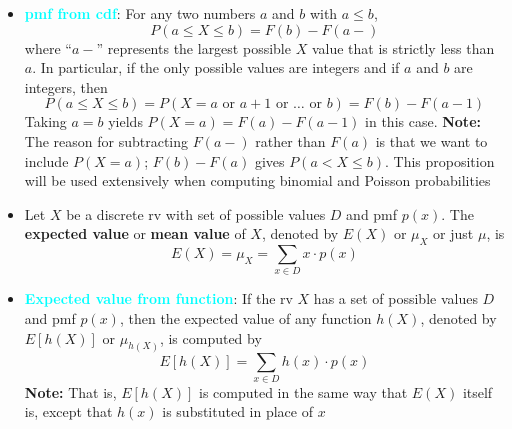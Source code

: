 \documentclass{report}
\begin{document}
\begin{itemize}
    \item \textbf{\textcolor{cyan}{pmf from cdf}}:
        For any two numbers \(a\) and \(b\) with \(a \leq b\),
        \[
            P(a \leq X \leq b) = F(b) - F(a-)
        \]
        where “\(a-\)” represents the largest possible \(X\) value that is strictly less than \(a\). In particular, if the only possible values are integers and if \(a\) and \(b\) are integers, then
        \[
            P(a \leq X \leq b) = P(X = a \text{ or } a + 1 \text{ or } \ldots \text{ or } b) = F(b) - F(a-1)
        \]
        Taking \(a = b\) yields \(P(X = a) = F(a) - F(a-1)\) in this case.
        \bigbreak \noindent 
        \textbf{Note:} The reason for subtracting \(F(a-)\) rather than \(F(a)\) is that we want to include \(P(X = a)\); \(F(b) - F(a)\) gives \(P(a < X \leq b)\). This proposition will be used extensively when computing binomial and Poisson probabilities 
    \item 
        Let \(X\) be a discrete rv with set of possible values \(D\) and pmf \(p(x)\). The \textbf{expected value} or \textbf{mean value} of \(X\), denoted by \(E(X)\) or \(\mu_X\) or just \(\mu\), is
        \[
            E(X) = \mu_X = \sum_{x \in D} x \cdot p(x)
        \]
    \item \textbf{\textcolor{cyan}{Expected value from function}}:
        If the rv \(X\) has a set of possible values \(D\) and pmf \(p(x)\), then the expected value of any function \(h(X)\), denoted by \(E[h(X)]\) or \(\mu_{h(X)}\), is computed by
        \[
            E[h(X)] = \sum_{x \in D} h(x) \cdot p(x)
        \]
        \bigbreak \noindent 
        \textbf{Note:} That is, $E[h(X)]$ is computed in the same way that $E(X)$ itself is, except that $h(x)$ is substituted in place of $x$


\end{itemize}
\end{document}
